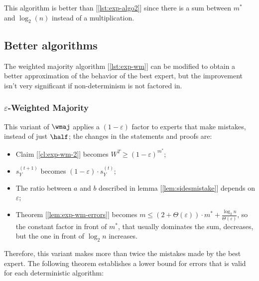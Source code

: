 This algorithm is better than [\ref{lst:exp-algo2}] since there is a sum between $m^*$ and $\log_2(n)$ instead of a multiplication.


\subsection{Better algorithms}

The weighted majority algorithm [\ref{lst:exp-wm}] can be modified to obtain a better approximation of the behavior of the best expert, but the improvement isn't very significant if non-determinism is not factored in.


\subsubsection{$\varepsilon$-Weighted Majority}

This variant of $\wmaj$ applies a $(1 - \varepsilon)$ factor to experts that make mistakes, instead of just $\half$; the changes in the statements and proofs are:
\begin{itemize}
    \item Claim [\ref{cl:exp-wm-2}] becomes $W^T \geq (1 - \varepsilon)^{m^*}$;
    \item $s_Y^{(t + 1)}$ becomes $(1 - \varepsilon) \cdot s_Y^{(t)}$;
    \item The ratio between $a$ and $b$ described in lemma [\ref{lem:sidesmistake}] depends on $\varepsilon$;
    \item Theorem [\ref{lem:exp-wm-errors}] becomes $m \leq (2 + \Theta(\varepsilon)) \cdot m^* + \frac{\log_2 n}{\Theta(\varepsilon)}$, so the constant factor in front of $m^*$, that usually dominates the sum, decreases, but the one in front of $\log_2 n$ increases.
\end{itemize}

Therefore, this variant makes more than twice the mistakes made by the best expert. The following theorem establishes a lower bound for errors that is valid for each deterministic algorithm:

